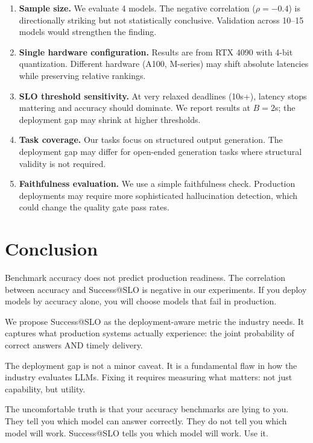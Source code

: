\documentclass[11pt]{article}
\begin{document}
\begin{enumerate}[leftmargin=12pt]
    \item \textbf{Sample size.} We evaluate 4 models. The negative correlation ($\rho = -0.4$) is directionally striking but not statistically conclusive. Validation across 10--15 models would strengthen the finding.

    \item \textbf{Single hardware configuration.} Results are from RTX 4090 with 4-bit quantization. Different hardware (A100, M-series) may shift absolute latencies while preserving relative rankings.

    \item \textbf{SLO threshold sensitivity.} At very relaxed deadlines (10s+), latency stops mattering and accuracy should dominate. We report results at $B = 2$s; the deployment gap may shrink at higher thresholds.

    \item \textbf{Task coverage.} Our tasks focus on structured output generation. The deployment gap may differ for open-ended generation tasks where structural validity is not required.

    \item \textbf{Faithfulness evaluation.} We use a simple faithfulness check. Production deployments may require more sophisticated hallucination detection, which could change the quality gate pass rates.
\end{enumerate}

\section{Conclusion}
\label{sec:conclusion}

Benchmark accuracy does not predict production readiness.
The correlation between accuracy and Success@SLO is negative in our experiments.
If you deploy models by accuracy alone, you will choose models that fail in production.

We propose Success@SLO as the deployment-aware metric the industry needs.
It captures what production systems actually experience: the joint probability of correct answers AND timely delivery.

The deployment gap is not a minor caveat.
It is a fundamental flaw in how the industry evaluates LLMs.
Fixing it requires measuring what matters: not just capability, but utility.

The uncomfortable truth is that your accuracy benchmarks are lying to you.
They tell you which model can answer correctly.
They do not tell you which model will work.
Success@SLO tells you which model will work.
Use it.



\end{document}
